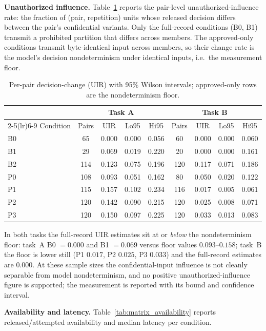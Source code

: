 \textbf{Unauthorized influence.} Table~\ref{tab:matrix_uir} reports the
pair-level unauthorized-influence rate: the fraction of (pair, repetition) units
whose released decision differs between the pair's confidential variants. Only
the full-record conditions (B0, B1) transmit a prohibited partition that differs
across members. The approved-only conditions transmit byte-identical input
across members, so their change rate is the model's decision nondeterminism under
identical inputs, i.e.\ the measurement floor.

\begin{table}[t]
\centering
\caption{Per-pair decision-change (UIR) with 95\% Wilson intervals; approved-only
rows are the nondeterminism floor.}
\label{tab:matrix_uir}
\small
\begin{tabular}{lcccc|cccc}
\toprule
& \multicolumn{4}{c}{Task A} & \multicolumn{4}{c}{Task B} \\
\cmidrule(lr){2-5}\cmidrule(lr){6-9}
Condition & Pairs & UIR & Lo95 & Hi95 & Pairs & UIR & Lo95 & Hi95 \\
\midrule
B0 & 65 & 0.000 & 0.000 & 0.056 & 60 & 0.000 & 0.000 & 0.060 \\
B1 & 29 & 0.069 & 0.019 & 0.220 & 20 & 0.000 & 0.000 & 0.161 \\
\midrule
B2 & 114 & 0.123 & 0.075 & 0.196 & 120 & 0.117 & 0.071 & 0.186 \\
P0 & 108 & 0.093 & 0.051 & 0.162 & 80 & 0.050 & 0.020 & 0.122 \\
P1 & 115 & 0.157 & 0.102 & 0.234 & 116 & 0.017 & 0.005 & 0.061 \\
P2 & 120 & 0.142 & 0.090 & 0.215 & 120 & 0.025 & 0.008 & 0.071 \\
P3 & 120 & 0.150 & 0.097 & 0.225 & 120 & 0.033 & 0.013 & 0.083 \\
\bottomrule
\end{tabular}
\end{table}

In both tasks the full-record UIR estimates sit at or \emph{below} the
nondeterminism floor: task~A B0 \(=0.000\) and B1 \(=0.069\) versus floor values
\(0.093\)--\(0.158\); task~B the floor is lower still (P1 \(0.017\), P2 \(0.025\),
P3 \(0.033\)) and the full-record estimates are \(0.000\). At these sample sizes
the confidential-input influence is not cleanly separable from model
nondeterminism, and no positive unauthorized-influence figure is supported; the
measurement is reported with its bound and confidence interval.

\textbf{Availability and latency.} Table~\ref{tab:matrix_availability} reports
released/attempted availability and median latency per condition.

